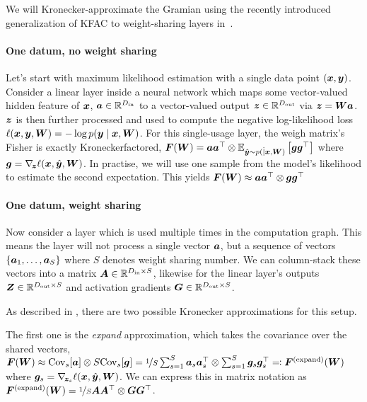 \documentclass{article}
\begin{document}

We will Kronecker-approximate the Gramian using the recently introduced generalization of KFAC to weight-sharing layers in~\citet{eschenhagen2023kroneckerfactored}.

\paragraph{One datum, no weight sharing} Let's start with maximum likelihood estimation with a single data point $({\bm{x}}, {\bm{y}})$.
Consider a linear layer inside a neural network which maps some vector-valued hidden feature of ${\bm{x}}$, ${\bm{a}} \in {\mathbb{R}}^{D_{\text{in}}}$ to a vector-valued output ${\bm{z}} \in {\mathbb{R}}^{D_{\text{out}}}$ via ${\bm{z}} = {\bm{W}} {\bm{a}}$.
${\bm{z}}$ is then further processed and used to compute the negative log-likelihood loss $\ell({\bm{x}}, {\bm{y}}, {\bm{W}}) = - \log p({\bm{y}} \mid {\bm{x}}, {\bm{W}})$.
For this single-usage layer, the weigh matrix's Fisher is exactly Kroneckerfactored, ${\bm{F}}({\bm{W}}) = {\bm{a}} {\bm{a}}^{\top} \otimes \mathbb{E}_{\hat{{\bm{y}}} \sim p(\dot \mid {\bm{x}}, {\bm{W}})}\left[ {\bm{g}} {\bm{g}}^{\top} \right]$ where ${\bm{g}} = \nabla_{\!{{\bm{z}}}} \ell({\bm{x}}, \hat{{\bm{y}}}, {\bm{W}})$.
In practise, we will use one sample from the model's likelihood to estimate the second expectation.
This yields ${\bm{F}}({\bm{W}}) \approx {\bm{a}} {\bm{a}}^{\top} \otimes {\bm{g}} {\bm{g}}^{\top}$

\paragraph{One datum, weight sharing} Now consider a layer which is used
multiple times in the computation graph. This means the layer will not process a
single vector ${\bm{a}}$, but a sequence of vectors $\left\{ {\bm{a}}_1, \dots, {\bm{a}}_S
\right\}$ where $S$ denotes weight sharing number. We can column-stack these
vectors into a matrix ${\bm{A}} \in {\mathbb{R}}^{D_{\text{in}}\times S}$, likewise for the
linear layer's outputs ${\bm{Z}} \in {\mathbb{R}}^{D_{\text{out}}\times S}$ and activation
gradients ${\bm{G}} \in {\mathbb{R}}^{D_{\text{out}} \times S}$.

As described in \citet{eschenhagen2023kroneckerfactored}, there are two possible Kronecker approximations for this setup.

The first one is the \emph{expand} approximation, which takes the covariance over the shared vectors, ${\bm{F}}({\bm{W}}) \approx \mathrm{Cov}_s[{\bm{a}}] \otimes S \mathrm{Cov}_s[{\bm{g}}] = \nicefrac{1}{S} \sum_{s=1}^S {\bm{a}}_s {\bm{a}}_s^{\top} \otimes \sum_{s=1}^S {\bm{g}}_s {\bm{g}}_s^{\top} \eqqcolon {\bm{F}}^{(\text{expand})}({\bm{W}})$ where ${\bm{g}}_s = \nabla_{\!{{\bm{z}}_s}} \ell({\bm{x}}, \hat{{\bm{y}}}, {\bm{W}})$.
We can express this in matrix notation as ${\bm{F}}^{(\text{expand})}({\bm{W}}) = \nicefrac{1}{S} {\bm{A}} {\bm{A}}^{\top} \otimes {\bm{G}} {\bm{G}}^{\top}$.
\end{document}

